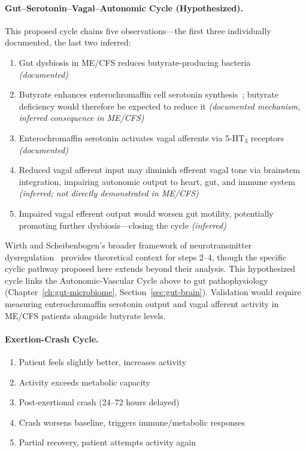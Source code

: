 \paragraph{Gut--Serotonin--Vagal--Autonomic Cycle (Hypothesized).}
This proposed cycle chains five observations---the first three individually documented, the last two inferred:
\begin{enumerate}
    \item Gut dysbiosis in ME/CFS reduces butyrate-producing bacteria~\cite{ButyrateDeficiency2023} \emph{(documented)}
    \item Butyrate enhances enterochromaffin cell serotonin synthesis~\cite{Barton2025}; butyrate deficiency would therefore be expected to reduce it \emph{(documented mechanism, inferred consequence in ME/CFS)}
    \item Enterochromaffin serotonin activates vagal afferents via 5-HT$_3$ receptors~\cite{Barton2023,Kaelberer2018} \emph{(documented)}
    \item Reduced vagal afferent input may diminish efferent vagal tone via brainstem integration, impairing autonomic output to heart, gut, and immune system \emph{(inferred; not directly demonstrated in ME/CFS)}
    \item Impaired vagal efferent output would worsen gut motility, potentially promoting further dysbiosis---closing the cycle \emph{(inferred)}
\end{enumerate}
Wirth and Scheibenbogen's broader framework of neurotransmitter dysregulation~\cite{WirthScheibenbogen2025Neurotransmitter} provides theoretical context for steps 2--4, though the specific cyclic pathway proposed here extends beyond their analysis. This hypothesized cycle links the Autonomic-Vascular Cycle above to gut pathophysiology (Chapter~\ref{ch:gut-microbiome}, Section~\ref{sec:gut-brain}). Validation would require measuring enterochromaffin serotonin output and vagal afferent activity in ME/CFS patients alongside butyrate levels.

\paragraph{Exertion-Crash Cycle.}
\begin{enumerate}
    \item Patient feels slightly better, increases activity
    \item Activity exceeds metabolic capacity
    \item Post-exertional crash (24--72 hours delayed)
    \item Crash worsens baseline, triggers immune/metabolic responses
    \item Partial recovery, patient attempts activity again
\end{enumerate}

